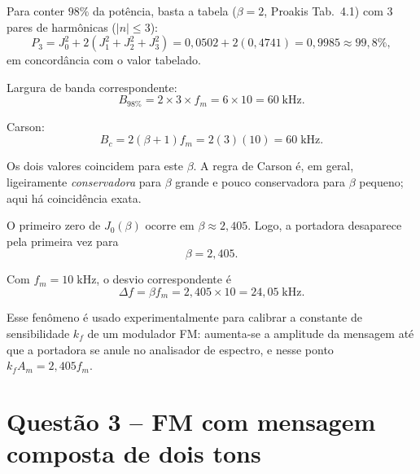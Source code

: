 \documentclass[11pt,a4paper]{article}
\begin{document}
\begin{resolucao}

Para conter $98\%$ da potência, basta a tabela ($\beta = 2$, Proakis Tab.~4.1) com $3$ pares de harmônicas ($|n| \le 3$):
\[
  P_3 = J_0^2 + 2(J_1^2 + J_2^2 + J_3^2) = 0{,}0502 + 2(0{,}4741) = 0{,}9985 \approx 99{,}8\%,
\]
em concordância com o valor tabelado.

Largura de banda correspondente:
\[
  B_{98\%} = 2 \times 3 \times f_m = 6 \times 10 = 60\;\text{kHz}.
\]

Carson:
\[
  B_c = 2(\beta + 1)f_m = 2(3)(10) = 60\;\text{kHz}.
\]

Os dois valores coincidem para este $\beta$. A regra de Carson é, em geral, ligeiramente \emph{conservadora} para $\beta$ grande e pouco conservadora para $\beta$ pequeno; aqui há coincidência exata.
\end{resolucao}

\begin{resolucao}

O primeiro zero de $J_0(\beta)$ ocorre em $\beta \approx 2{,}405$. Logo, a portadora desaparece pela primeira vez para
\[
  \boxed{\beta = 2{,}405.}
\]

Com $f_m = 10\;\text{kHz}$, o desvio correspondente é
\[
  \Delta f = \beta f_m = 2{,}405 \times 10 = 24{,}05\;\text{kHz}.
\]

Esse fenômeno é usado experimentalmente para calibrar a constante de sensibilidade $k_f$ de um modulador FM: aumenta-se a amplitude da mensagem até que a portadora se anule no analisador de espectro, e nesse ponto $k_f A_m = 2{,}405 f_m$.
\end{resolucao}

\section*{Questão 3 -- FM com mensagem composta de dois tons}
\end{document}
